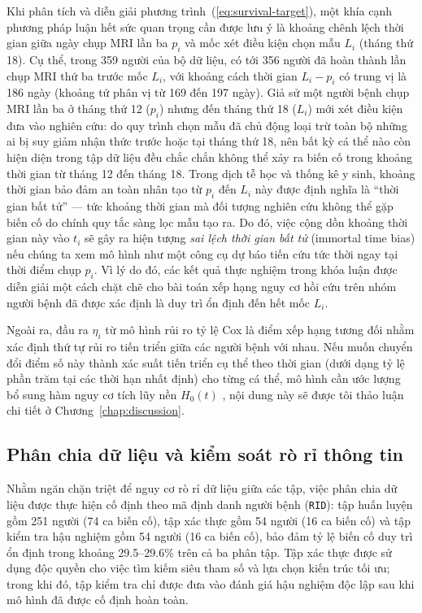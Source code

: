 Khi phân tích và diễn giải phương trình~(\ref{eq:survival-target}), một khía cạnh phương pháp luận hết sức quan trọng cần được lưu ý là khoảng chênh lệch thời gian giữa ngày chụp MRI lần ba $p_i$ và mốc xét điều kiện chọn mẫu $L_i$ (tháng thứ 18). Cụ thể, trong 359 người của bộ dữ liệu, có tới 356 người đã hoàn thành lần chụp MRI thứ ba trước mốc $L_i$, với khoảng cách thời gian $L_i - p_i$ có trung vị là 186 ngày (khoảng tứ phân vị từ 169 đến 197 ngày). Giả sử một người bệnh chụp MRI lần ba ở tháng thứ 12 ($p_i$) nhưng đến tháng thứ 18 ($L_i$) mới xét điều kiện đưa vào nghiên cứu: do quy trình chọn mẫu đã chủ động loại trừ toàn bộ những ai bị suy giảm nhận thức trước hoặc tại tháng thứ 18, nên bất kỳ cá thể nào còn hiện diện trong tập dữ liệu đều chắc chắn không thể xảy ra biến cố trong khoảng thời gian từ tháng 12 đến tháng 18. Trong dịch tễ học và thống kê y sinh, khoảng thời gian bảo đảm an toàn nhân tạo từ $p_i$ đến $L_i$ này được định nghĩa là ``thời gian bất tử'' — tức khoảng thời gian mà đối tượng nghiên cứu không thể gặp biến cố do chính quy tắc sàng lọc mẫu tạo ra. Do đó, việc cộng dồn khoảng thời gian này vào $t_i$ sẽ gây ra hiện tượng \emph{sai lệch thời gian bất tử} (immortal time bias) \cite{suissa2008immortal} nếu chúng ta xem mô hình như một công cụ dự báo tiến cứu tức thời ngay tại thời điểm chụp $p_i$. Vì lý do đó, các kết quả thực nghiệm trong khóa luận được diễn giải một cách chặt chẽ cho bài toán xếp hạng nguy cơ hồi cứu trên nhóm người bệnh đã được xác định là duy trì ổn định đến hết mốc $L_i$.

Ngoài ra, đầu ra $\eta_i$ từ mô hình rủi ro tỷ lệ Cox là điểm xếp hạng tương đối nhằm xác định thứ tự rủi ro tiến triển giữa các người bệnh với nhau. Nếu muốn chuyển đổi điểm số này thành xác suất tiến triển cụ thể theo thời gian (dưới dạng tỷ lệ phần trăm tại các thời hạn nhất định) cho từng cá thể, mô hình cần ước lượng bổ sung hàm nguy cơ tích lũy nền $H_0(t)$ \cite{cox1972regression}, nội dung này sẽ được tôi thảo luận chi tiết ở Chương~\ref{chap:discussion}.

\subsection{Phân chia dữ liệu và kiểm soát rò rỉ thông tin}
\label{sec:data-split}
Nhằm ngăn chặn triệt để nguy cơ rò rỉ dữ liệu giữa các tập, việc phân chia dữ liệu được thực hiện cố định theo mã định danh người bệnh (\texttt{RID}): tập huấn luyện gồm 251 người (74 ca biến cố), tập xác thực gồm 54 người (16 ca biến cố) và tập kiểm tra hậu nghiệm gồm 54 người (16 ca biến cố), bảo đảm tỷ lệ biến cố duy trì ổn định trong khoảng 29.5--29.6\% trên cả ba phân tập. Tập xác thực được sử dụng độc quyền cho việc tìm kiếm siêu tham số và lựa chọn kiến trúc tối ưu; trong khi đó, tập kiểm tra chỉ được đưa vào đánh giá hậu nghiệm độc lập sau khi mô hình đã được cố định hoàn toàn.

